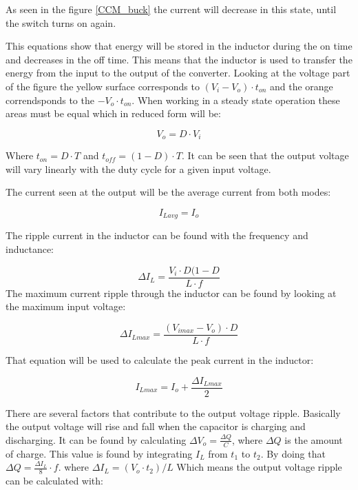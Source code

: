 As seen in the figure \ref{CCM_buck} the current will decrease in this state, until the switch turns on again.

This equations show that energy will be stored in the inductor during the on time and decreases in the off time. This means that the inductor is used to transfer the energy from the input to the output of the converter. 
Looking at the voltage part of the figure the yellow surface corresponds to $(V_i-V_o)\cdot t_{on}$ and the orange correndsponds to the $-V_o\cdot t_{on}$. When working in a steady state operation these areas must be equal which in reduced form will be:

\begin{equation}
V_o = D\cdot V_i
\end{equation}

Where $t_{on}=D\cdot T$ and $t_{off}=(1-D)\cdot T$. It can be seen that the output voltage will vary linearly with the duty cycle for a given input voltage.

The current seen at the output will be the average current from both modes:

\begin{equation} \label{Iavg}
I_{Lavg}=I_o
\end{equation}

The ripple current in the inductor can be found with the frequency and inductance:

\begin{equation}\label{buckind}
\Delta I_L = \frac{V_i\cdot D(1-D}{L\cdot f}
\end{equation}
The maximum current ripple through the inductor can be found by looking at the maximum input voltage:

\begin{equation}
\Delta I_{Lmax} = \frac{(V_{imax}-V_{o})\cdot D}{L\cdot f}
\end{equation}

That equation will be used to calculate the peak current in the inductor:

\begin{equation}
I_{Lmax} = I_o + \frac{\Delta I_{Lmax}}{2}
\end{equation}

There are several factors that contribute to the output voltage ripple. Basically the output voltage will rise and fall when the capacitor is charging and discharging. It can be found by calculating $\Delta V_o = \frac{\Delta Q}{C}$, where $\Delta Q$ is the amount of charge. This value is found by integrating $I_L$ from $t_1$ to $t_2$. By doing that $\Delta Q = \frac{\Delta I_L}{8}\cdot f$. where $\Delta I_L = (V_o\cdot t_2)/L$ Which means the output voltage ripple can be calculated with:
 
